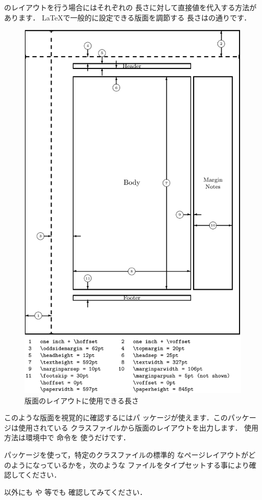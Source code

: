 のレイアウトを行う場合にはそれぞれの
長さに対して直接値を代入する方法があります．
{\LaTeX}で一般的に設定できる版面を調節する
長さはの通りです．
\begin{figure}[p]
 \begin{center}
  \includegraphics[width=.8\textwidth]{images/mylayout}
  \caption{版面のレイアウトに使用できる長さ}
 \end{center}
\end{figure}
%
このような版面を視覚的に確認するにはパ
ッケージが使えます．このパッケージは使用されている%
クラスファイルから版面のレイアウトを出力します．
使用方法は環境中で  命令を
使うだけです．

\begin{Prob}
パッケージを使って，特定のクラスファイルの標準的
なページレイアウトがどのようになっているかを，次のような
ファイルをタイプセットする事により確認してください．


以外にも  や  等でも
確認してみてください．
\end{Prob}


